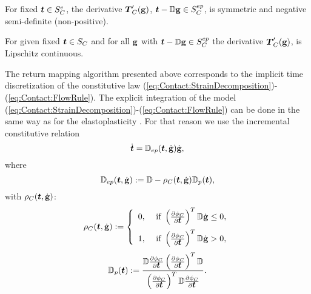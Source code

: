\documentclass[12pt,a4paper]{scrbook}
\begin{document}
\begin{thm}\label{thm:ContactFunctionalSymmetricityPositivity}
For fixed $\mbox{\boldmath$t$}\in S^{e}_C$, the derivative $\mbox{\boldmath$T$}_{C}'(\mbox{\boldmath$\mathrm{g}$})$, $\mbox{\boldmath$t$}-{\mathbb D}\mbox{\boldmath$\mathrm{g}$}\in S_C^{ep}$, is symmetric and negative semi-definite (non-positive).
\end{thm}


\begin{thm}\label{thm:ContactFunctionalLipschitzContinuity}
For given fixed $\mbox{\boldmath$t$}\in S_C$ and for all $\mbox{\boldmath$\mathrm{g}$}$ with $\mbox{\boldmath$t$}-{\mathbb D}\mbox{\boldmath$\mathrm{g}$}\in S_C^{ep}$ the derivative $\mbox{\boldmath$T$}_{C}'(\mbox{\boldmath$\mathrm{g}$})$, is Lipschitz continuous.
\end{thm}


The return mapping algorithm presented above corresponds to the implicit time discretization of the constitutive law (\ref{eq:Contact:StrainDecomposition})-(\ref{eq:Contact:FlowRule}). The explicit integration of the model (\ref{eq:Contact:StrainDecomposition})-(\ref{eq:Contact:FlowRule}) can be done in the same way as for the elastoplasticity \cite{AxBlKo97,BlAx97,KoLa84}. For that reason we use the incremental constitutive relation
\begin{equation}\label{eq:Contact:Explicit:DotTractionDotGap}
 \dot{\mbox{\boldmath$t$}}={\mathbb D}_{ep}(\mbox{\boldmath$t$},\dot{\mbox{\boldmath$\mathrm{g}$}})\dot{\mbox{\boldmath$\mathrm{g}$}},
\end{equation}
where 
\begin{equation}\label{eq:Contact:Explicit:DepDefinition}
{\mathbb D}_{ep}(\mbox{\boldmath$t$},\dot{\mbox{\boldmath$\mathrm{g}$}}):={\mathbb D}-\rho_{C}(\mbox{\boldmath$t$},\dot{\mbox{\boldmath$\mathrm{g}$}}){\mathbb D}_{p}(\mbox{\boldmath$t$}),
\end{equation}
with $\rho_{C}(\mbox{\boldmath$t$},\dot{\mbox{\boldmath$\mathrm{g}$}})$:
\begin{equation}\label{eq:Contact:Explicit:rhoDefinition}
\rho_{C}(\mbox{\boldmath$t$},\dot{\mbox{\boldmath$\mathrm{g}$}}):=\left\lbrace \begin{array}{cc} 0,& \mbox{ if } \left(\frac{\partial \phi_{C}}{\partial \mbox{\boldmath$t$}}\right)^T {\mathbb D} \dot{\mbox{\boldmath$\mathrm{g}$}}\leq 0,\\[2ex] 1, &\mbox{ if } \left(\frac{\partial \phi_{C}}{\partial \mbox{\boldmath$t$}}\right)^T {\mathbb D} \dot{\mbox{\boldmath$\mathrm{g}$}}>0,\end{array}\right.
\end{equation}
\begin{equation}\label{eq:Contact:Explicit:DpDefinition}
{\mathbb D}_{p}(\mbox{\boldmath$t$}):=\frac{{\mathbb D}\frac{\partial \phi_{C}}{\partial \mbox{\boldmath$t$}}\left(\frac{\partial \phi_{C}}{\partial \mbox{\boldmath$t$}}\right)^T{\mathbb D}}{\left(\frac{\partial \phi_{C}}{\partial \mbox{\boldmath$t$}}\right)^T{\mathbb D} \frac{\partial \phi_{C}}{\partial \mbox{\boldmath$t$}}}.
\end{equation}
\end{document}
